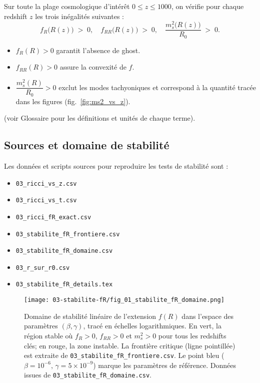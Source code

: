 Sur toute la plage cosmologique d’intérêt \(0 \le z \le 1000\), on vérifie pour chaque redshift \(z\) les trois inégalités suivantes :
\[
  f_{R}\bigl(R(z)\bigr) \;>\; 0,
  \quad
  f_{RR}\bigl(R(z)\bigr) \;>\; 0,
  \quad
  \frac{m_{s}^{2}\bigl(R(z)\bigr)}{R_{0}} \;>\; 0.
\]
\begin{itemize}
  \item \(f_{R}(R)>0\) garantit l’absence de ghost.  
  \item \(f_{RR}(R)>0\) assure la convexité de \(f\).  
  \item \(\dfrac{m_{s}^{2}(R)}{R_{0}}>0\) exclut les modes tachyoniques et correspond à la quantité tracée dans les figures (fig.~\ref{fig:ms2_vs_z}).  
\end{itemize} 
(voir Glossaire pour les définitions et unités de chaque terme).

\subsection{Sources et domaine de stabilité}

Les données et scripts sources pour reproduire les tests de stabilité sont :
\begin{itemize}
  \item \texttt{03\_ricci\_vs\_z.csv} %
  \item \texttt{03\_ricci\_vs\_t.csv}  %
  \item \texttt{03\_ricci\_fR\_exact.csv}
  \item \texttt{03\_stabilite\_fR\_frontiere.csv}
  \item \texttt{03\_stabilite\_fR\_domaine.csv}
  \item \texttt{03\_r\_sur\_r0.csv} %
  \item \texttt{03\_stabilite\_fR\_details.tex}
\end{itemize}

\begin{figure}[htbp]
  \centering
  \texttt{[image: 03-stabilite-fR/fig\_01\_stabilite\_fR\_domaine.png]}
  \caption{Domaine de stabilité linéaire de l’extension \(f(R)\) dans l’espace des paramètres \((\beta,\gamma)\), tracé en échelles logarithmiques.  
    En vert, la région stable où \(f_R>0\), \(f_{RR}>0\) et \(m_s^2>0\) pour tous les redshifts clés; en rouge, la zone instable.  
    La frontière critique (ligne pointillée) est extraite de \texttt{03\_stabilite\_fR\_frontiere.csv}.  
    Le point bleu (\(\beta=10^{-6},\,\gamma=5\times10^{-9}\)) marque les paramètres de référence.  
    Données issues de \texttt{03\_stabilite\_fR\_domaine.csv}.}
  \label{fig:stabilite_fR_domaine}
\end{figure}

